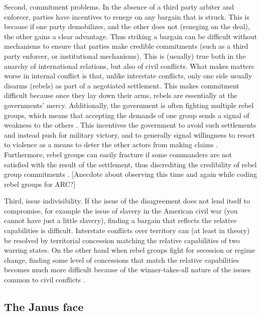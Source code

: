 Second, commitment problems. In the absence of a third party arbiter and
enforcer, parties have incentives to renege on any bargain that is struck. This
is because if one party demobilizes, and the other does not (reneging on the
deal), the other gains a clear advantage. Thus striking a bargain can be
difficult without mechanisms to ensure that parties make credible commitments
(such as a third party enforcer, or institutional mechanisms). This is (usually)
true both in the anarchy of international relations, but also of civil
conflicts. What makes matters worse in internal conflict is that, unlike
interstate conflicts, only one side usually disarms (rebels) as part of a
negotiated settlement. This makes commitment difficult because once they lay
down their arms, rebels are essentially at the governments' mercy. Additionally,
the government is often fighting multiple rebel groups, which means that
accepting the demands of one group sends a signal of weakness to the others
\citep{Cunningham2006}. This incentives the government to avoid such settlements
and instead push for military victory, and to generally signal willingness to
resort to violence as a means to deter the other actors from making claims
\citep{Walter2006, Walter2009}. Furthermore, rebel groups can easily fracture if
some commanders are not satisfied with the result of the settlement, thus
discrediting the credibility of rebel group commitments \citep{Cunningham2013c}. 
[Anecdote about observing this time and again while coding rebel groups for
ARC?]

Third, issue indivisibility. If the issue of the disagreement does not lend
itself to compromise, for example the issue of slavery in the American civil war
(you cannot have just a little slavery), finding a bargain that reflects the
relative capabilities is difficult. Interstate conflicts over territory can (at
least in theory) be resolved by territorial concession matching the relative
capabilities of two warring states. On the other hand when rebel groups fight
for secession or regime change, finding some level of concessions that match the
relative capabilities becomes much more difficult because of the
winner-takes-all nature of the issues common to civil conflicts \citep{Toft2005,
Duffy_Toft_2002}. 


\subsection{The Janus face}
\label{Janus}

